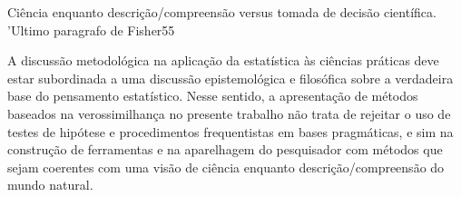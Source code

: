 Ciência enquanto descrição/compreensão versus tomada de decisão científica. 'Ultimo paragrafo de Fisher55

A discussão metodológica na aplicação da estatística às ciências práticas deve estar subordinada a uma discussão
epistemológica e filosófica sobre a verdadeira base do pensamento estatístico. Nesse sentido, a apresentação de
métodos baseados na verossimilhança no presente trabalho não trata de rejeitar o uso de testes de hipótese 
e procedimentos frequentistas em
bases pragmáticas, e sim na construção de ferramentas e na aparelhagem do pesquisador com métodos que sejam
coerentes com uma visão de ciência enquanto descrição/compreensão do mundo natural.

